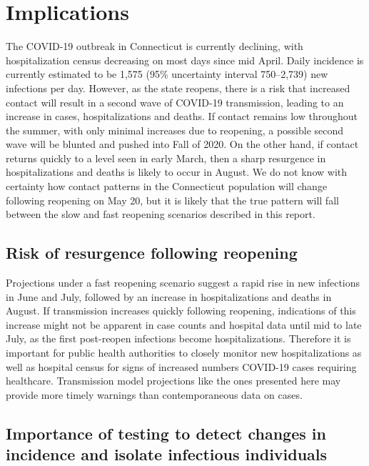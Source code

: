 \documentclass[11pt]{article}
\begin{document}


\section*{Implications}

The COVID-19 outbreak in Connecticut is currently declining, with hospitalization census decreasing on most days since mid April.  Daily incidence is currently estimated to be 1,575 (95\% uncertainty interval 750--2,739) new infections per day.  However, as the state reopens, there is a risk that increased contact will result in a second wave of COVID-19 transmission, leading to an increase in cases, hospitalizations and deaths. If contact remains low throughout the summer, with only minimal increases due to reopening, a possible second wave will be blunted and pushed into Fall of 2020.  On the other hand, if contact returns quickly to a level seen in early March, then a sharp resurgence in hospitalizations and deaths is likely to occur in August.  We do not know with certainty how contact patterns in the Connecticut population will change following reopening on May 20, but it is likely that the true pattern will fall between the slow and fast reopening scenarios described in this report.  


\subsection*{Risk of resurgence following reopening} 

Projections under a fast reopening scenario suggest a rapid rise in new infections in June and July, followed by an increase in hospitalizations and deaths in August.  If transmission increases quickly following reopening, indications of this increase might not be apparent in case counts and hospital data until mid to late July, as the first post-reopen infections become hospitalizations.  Therefore it is important for public health authorities to closely monitor new hospitalizations as well as hospital census for signs of increased numbers COVID-19 cases requiring healthcare. Transmission model projections like the ones presented here may provide more timely warnings than contemporaneous data on cases.  


\subsection*{Importance of testing to detect changes in incidence and isolate infectious individuals}
\end{document}
